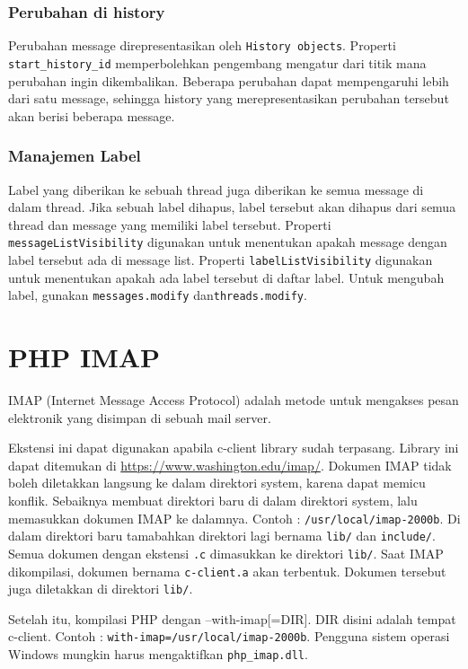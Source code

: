 \subsubsection{Perubahan di history}
Perubahan message direpresentasikan oleh \texttt{History objects}. Properti \texttt{start\_history\_id} memperbolehkan pengembang mengatur dari titik mana perubahan ingin dikembalikan. Beberapa perubahan dapat mempengaruhi lebih dari satu message, sehingga history yang merepresentasikan perubahan tersebut akan berisi beberapa message.

\subsubsection{Manajemen Label}
Label yang diberikan ke sebuah thread juga diberikan ke semua message di dalam thread. Jika sebuah label dihapus, label tersebut akan dihapus dari semua thread dan message yang memiliki label tersebut. Properti \texttt{messageListVisibility} digunakan untuk menentukan apakah message dengan label tersebut ada di message list. Properti \texttt{labelListVisibility} digunakan untuk menentukan apakah ada label tersebut di daftar label. Untuk mengubah label, gunakan \texttt{messages.modify} dan\texttt{threads.modify}.

\section{PHP IMAP ~\cite{php-imap}}
\label{sec:PHPIMAP}
IMAP (Internet Message Access Protocol) adalah metode untuk mengakses pesan elektronik yang disimpan di sebuah mail server.

Ekstensi ini dapat digunakan apabila c-client library sudah terpasang. Library ini dapat ditemukan di \url{https://www.washington.edu/imap/}. Dokumen IMAP tidak boleh diletakkan langsung ke dalam direktori system, karena dapat memicu konflik. Sebaiknya membuat direktori baru di dalam direktori system, lalu memasukkan dokumen IMAP ke dalamnya. Contoh : \texttt{/usr/local/imap-2000b}. Di dalam direktori baru tamabahkan direktori lagi bernama \texttt{lib/} dan \texttt{include/}. Semua dokumen dengan ekstensi \texttt{.c} dimasukkan ke direktori \texttt{lib/}. Saat IMAP dikompilasi, dokumen bernama \texttt{c-client.a} akan terbentuk. Dokumen tersebut juga diletakkan di direktori \texttt{lib/}.

Setelah itu, kompilasi PHP dengan --with-imap[=DIR]. DIR disini adalah tempat c-client. Contoh : \texttt{with-imap=/usr/local/imap-2000b}. Pengguna sistem operasi Windows mungkin harus mengaktifkan \texttt{php\_imap.dll}.

